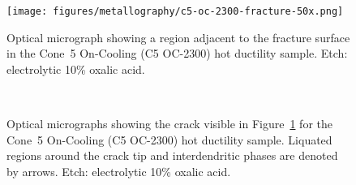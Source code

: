 {%

\begin{figure}
    \centering
    \texttt{[image: figures/metallography/c5-oc-2300-fracture-50x.png]}
    \caption{Optical micrograph showing a region adjacent to the fracture surface in the Cone~5 On-Cooling \protect{} (C5 OC-2300) hot ductility sample. Etch: electrolytic 10\% oxalic acid.}
    \label{fig:c5-oc-2300-fracture-50x}
\end{figure}

\begin{figure}
    \centering
     \\
    \caption{Optical micrographs showing the crack visible in Figure~\ref{fig:c5-oc-2300-fracture-50x} for the Cone~5 On-Cooling \protect{} (C5 OC-2300) hot ductility sample. Liquated regions around the crack tip and interdendritic phases are denoted by arrows. Etch: electrolytic 10\% oxalic acid.}
    \label{fig:c5-oc-2300-crack-olm}
\end{figure}

}
